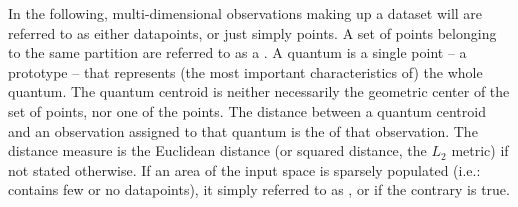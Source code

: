 			In the following, multi-dimensional observations making up a dataset will are referred to as either datapoints, or just simply points.
			A set of points belonging to the same partition are referred to as a .
			A quantum  is a single point -- a prototype -- that represents (the most important characteristics of) the whole quantum.
			The quantum centroid is neither necessarily the geometric center of the set of points, nor one of the points.
			The distance between a quantum centroid and an observation assigned to that quantum is the  of that observation.
			The distance measure is the Euclidean distance (or squared distance, the $L_2$ metric) if not stated otherwise.
			If an area of the input space is sparsely populated (i.e.: contains few or no datapoints), it simply referred to as , or  if the contrary is true.
			
